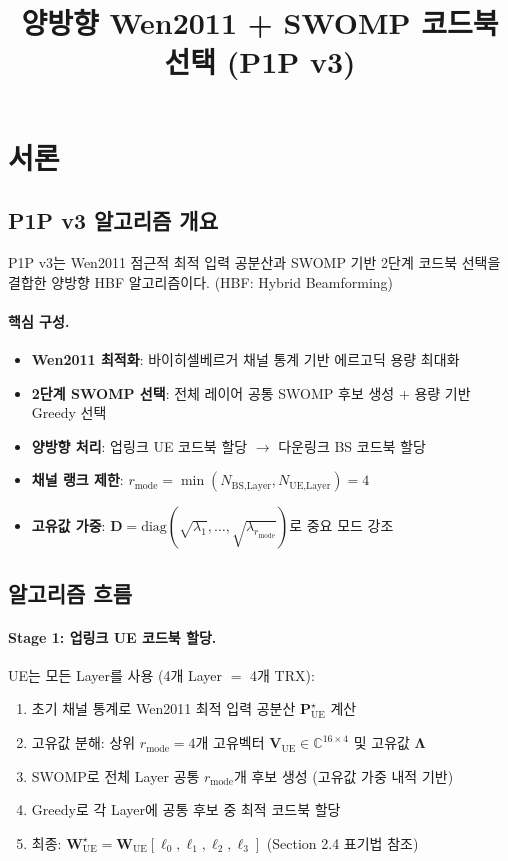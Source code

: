 \documentclass[10pt]{article}
\title{양방향 Wen2011 + SWOMP 코드북 선택 (P1P v3)}
\author{}
\date{}
\begin{document}
\maketitle

\section{서론}

\subsection{P1P v3 알고리즘 개요}

P1P v3는 Wen2011 점근적 최적 입력 공분산과 SWOMP 기반 2단계 코드북 선택을 결합한 양방향 HBF 알고리즘이다. (HBF: Hybrid Beamforming)

\paragraph{핵심 구성.}
\begin{itemize}
    \item \textbf{Wen2011 최적화}: 바이히셀베르거 채널 통계 기반 에르고딕 용량 최대화
    \item \textbf{2단계 SWOMP 선택}: 전체 레이어 공통 SWOMP 후보 생성 + 용량 기반 Greedy 선택
    \item \textbf{양방향 처리}: 업링크 UE 코드북 할당 $\rightarrow$ 다운링크 BS 코드북 할당
    \item \textbf{채널 랭크 제한}: $r_{\text{mode}} = \min(N_{\text{BS,Layer}}, N_{\text{UE,Layer}}) = 4$
    \item \textbf{고유값 가중}: $\mathbf{D} = \text{diag}(\sqrt{\lambda_1}, \ldots, \sqrt{\lambda_{r_{\text{mode}}}})$로 중요 모드 강조
\end{itemize}

\subsection{알고리즘 흐름}

\paragraph{Stage 1: 업링크 UE 코드북 할당.}
UE는 모든 Layer를 사용 (4개 Layer $=$ 4개 TRX):
\begin{enumerate}
    \item 초기 채널 통계로 Wen2011 최적 입력 공분산 $\mathbf{P}_{\text{UE}}^{\star}$ 계산
    \item 고유값 분해: 상위 $r_{\text{mode}}=4$개 고유벡터 $\mathbf{V}_{\text{UE}} \in \mathbb{C}^{16 \times 4}$ 및 고유값 $\boldsymbol{\Lambda}$
    \item SWOMP로 전체 Layer 공통 $r_{\text{mode}}$개 후보 생성 (고유값 가중 내적 기반)
    \item Greedy로 각 Layer에 공통 후보 중 최적 코드북 할당
    \item 최종: $\mathbf{W}_{\text{UE}}^{\star} = \mathbf{W}_{\text{UE}}[\ell_0, \ell_1, \ell_2, \ell_3]$ (Section 2.4 표기법 참조)
\end{enumerate}
\end{document}
